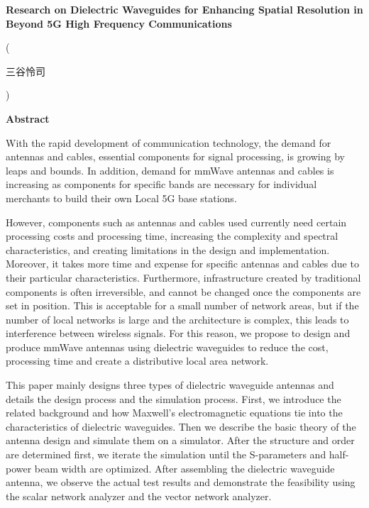 \documentclass[a4paper,12pt]{report}
\begin{document}
\thispagestyle{plain}
\begin{center}
    \Large
    \textbf{Research on Dielectric Waveguides for Enhancing Spatial Resolution in Beyond 5G High Frequency Communications}
        
    \vspace{0.4cm}
    \large
        
    \vspace{0.4cm}
    (\begin{CJK}{UTF8}{ipxm}三谷怜司\end{CJK})
       
    \vspace{0.9cm}
    \textbf{Abstract}
\end{center}

With the rapid development of communication technology, the demand
for antennas and cables, essential components for signal processing,
is growing by leaps and
bounds.
In addition,
demand for mmWave antennas and cables is increasing as
components for specific bands are necessary for individual
merchants to build their own Local 5G base stations.

However, components such as antennas and cables used
currently need certain
processing costs and processing time,
increasing the complexity and spectral characteristics,
and creating limitations in the design and implementation.
Moreover, it takes
more time and expense for specific antennas and cables
due to their particular
characteristics.
Furthermore, infrastructure created by traditional components
is often irreversible, and cannot be changed once
the components are set in position.
This is acceptable for a small number of network areas, but if the number
of local networks is large and the architecture is complex,
this leads to interference between wireless signals.
For this reason, we propose to design and produce
mmWave antennas using dielectric waveguides to reduce the cost,
processing time
and create a distributive local area network.

This paper mainly designs three types of dielectric waveguide antennas
and details the design process and the simulation process.
First, we introduce the related background
and how Maxwell's electromagnetic equations tie into the characteristics
of dielectric waveguides.
Then we describe the basic theory of the antenna design
and simulate them on a simulator.
After the structure and order are determined first,
we iterate the simulation until
the S-parameters and half-power beam width are optimized.
After
assembling the dielectric waveguide antenna,
we observe the actual
test results and demonstrate the feasibility
using the scalar network analyzer and the vector network analyzer.
\end{document}
